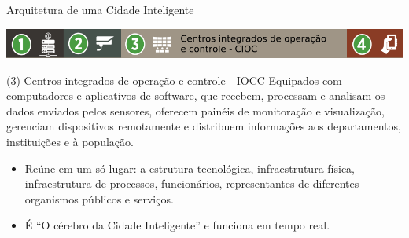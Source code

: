 \documentclass{beamer}
\begin{document}
\begin{frame}{Arquitetura de uma Cidade Inteligente}
\begin{center}
\includegraphics[width=1\textwidth]{img/arquitetura-menu-3.png}  
\end{center}
\begin{exampleblock}{(3) Centros integrados de operação e controle - IOCC}
Equipados com computadores e aplicativos de software, que recebem, 
processam e analisam os dados enviados pelos sensores, oferecem painéis de monitoração e visualização, gerenciam 
dispositivos remotamente e distribuem informações aos departamentos, instituições e à população.
\begin{itemize}
\item Reúne em um só lugar: a estrutura tecnológica, infraestrutura física, infraestrutura de processos, funcionários, representantes 
de diferentes organismos públicos e serviços.
\item É ``O cérebro da Cidade Inteligente'' e funciona em tempo real.
\end{itemize}

\end{exampleblock}



\end{frame}
\end{document}
